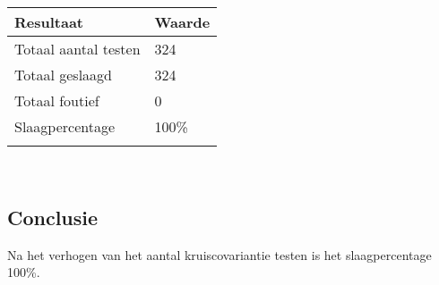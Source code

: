 \begin{tabular}{ l  l}
	\hline
	\textbf{Resultaat} & \textbf{Waarde} \\
	\hline
	Totaal aantal testen & 324 \\
	Totaal geslaagd & 324 \\
	Totaal foutief & 0 \\
	Slaagpercentage & 100\% \\
	\\
\end{tabular}\\

\subsection*{Conclusie}

Na het verhogen van het aantal kruiscovariantie testen is het slaagpercentage 100\%.